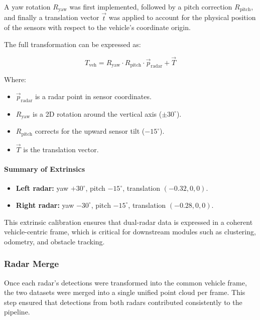 A yaw rotation \( R_{\text{yaw}} \) was first implemented, followed by a pitch correction \( R_{\text{pitch}} \), and finally a translation vector \( \vec{t} \) was applied to account for the physical position of the sensors with respect to the vehicle's coordinate origin.

The full transformation can be expressed as:

\begin{equation}
T_{\text{veh}} = R_{\text{yaw}} \cdot R_{\text{pitch}} \cdot \vec{p}_{\text{radar}} + \vec{T}
\label{eq:radar_to_vehicle_transform}
\end{equation}

Where:
\begin{itemize}
    \item \( \vec{p}_{\text{radar}} \) is a radar point in sensor coordinates.
    \item \( R_{\text{yaw}} \) is a 2D rotation around the vertical axis ($\pm30^\circ$).
    \item \( R_{\text{pitch}} \) corrects for the upward sensor tilt ($-15^\circ$).
    \item \( \vec{T} \) is the translation vector.
\end{itemize}

\paragraph{Summary of Extrinsics}
\begin{itemize}
    \item \textbf{Left radar:} yaw $+30^\circ$, pitch $-15^\circ$, translation $(-0.32, 0, 0)$.
    \item \textbf{Right radar:} yaw $-30^\circ$, pitch $-15^\circ$, translation $(-0.28, 0, 0)$.
\end{itemize}

This extrinsic calibration ensures that dual-radar data is expressed in a coherent vehicle-centric frame, which is critical for downstream modules such as clustering, odometry, and obstacle tracking.

\vspace{0.5em}
\subsubsection{Radar Merge}  
\indent Once each radar's detections were transformed into the common vehicle frame, the two datasets were merged into a single unified point cloud per frame.  
This step ensured that detections from both radars contributed consistently to the pipeline.  

